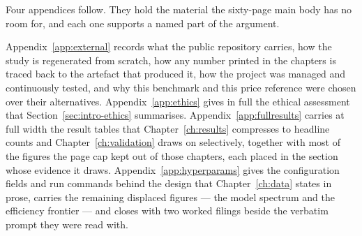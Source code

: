 \documentclass[11pt,a4paper,oneside]{book}
\begin{document}







\clearpage
{}
{}

\begin{appendices}
\thispagestyle{plain}
{\centering\normalfont\Huge\bfseries\appendixpagename\par}
\vspace{2\baselineskip}
\noindent
Four appendices follow. They hold the material the sixty-page main body has no
room for, and each one supports a named part of the argument.

\noindent
Appendix~\ref{app:external} records what the public repository carries, how the
study is regenerated from scratch, how any number printed in the chapters is
traced back to the artefact that produced it, how the project was managed and
continuously tested, and why this benchmark and this price reference were
chosen over their alternatives.
Appendix~\ref{app:ethics} gives in full the ethical assessment that
Section~\ref{sec:intro-ethics} summarises.
Appendix~\ref{app:fullresults} carries at full width the result tables that
Chapter~\ref{ch:results} compresses to headline counts and
Chapter~\ref{ch:validation} draws on selectively, together with most of the figures the
page cap kept out of those chapters, each placed in the section whose evidence it
draws.
Appendix~\ref{app:hyperparams} gives the configuration fields and run commands
behind the design that Chapter~\ref{ch:data} states in prose, carries the
remaining displaced figures --- the model spectrum and the efficiency frontier
--- and closes with two
worked filings beside the verbatim prompt they were read with.
\makeatletter
\setlength{\@fptop}{0pt}
\setlength{\@fpsep}{12pt plus 1fil}
\setlength{\@fpbot}{0pt plus 1fil}
\makeatother





\end{appendices}
\end{document}
